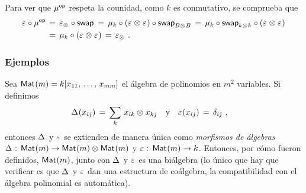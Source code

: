 %
Para ver que $\producto^\opp$ respeta la counidad, como $k$ es conmutativo, se
comprueba que
\begin{align*}
	\counidad\circ\producto^\opp & \,=\,\counidad[\tensor]\circ\swap\,=\,
		\producto[k]\circ(\counidad\tensor\counidad)\circ
			\swap[B\tensor B] \,=\,
		\producto[k]\circ\swap[k\tensor k]\circ
			(\counidad\tensor\counidad) \\
	& \,=\, \producto[k]\circ(\counidad\tensor\counidad)\,=\,
		\counidad[\tensor]
	\text{ .}
\end{align*}
%

\subsubsection{Ejemplos}

\begin{ejemploBialgebra}\label{ejemplo:bialgebramatrices}
	Sea $\MM(m)=k[\lista[11]{x}{mm}]$ el \'{a}lgebra de polinomios en $m^2$
	variables. Si definimos
	\begin{align*}
		\coproducto(x_{ij}) \,=\,\sum_k\,x_{ik}\tensor x_{kj}
			& \quad\text{y}\quad
		\counidad(x_{ij}) \,=\,\delta_{ij}
		\text{ ,}
	\end{align*}
	entonces $\coproducto$ y $\counidad$ se extienden de manera \'{u}nica
	como \emph{morfismos de \'{a}lgebras}
	$\coproducto:\,\MM(m)\rightarrow\MM(m)\tensor\MM(m)$ y
	$\counidad:\,\MM(m)\rightarrow k$. Entonces, por c\'{o}mo fueron
	definidos, $\MM(m)$, junto con $\coproducto$ y $\counidad$ es una
	bi\'{a}lgebra (lo \'{u}nico que hay que verificar es que
	$\coproducto$ y $\counidad$ dan una estructura de co\'{a}lgebra, la
	compatibilidad con el \'{a}lgebra polinomial es autom\'{a}tica).
\end{ejemploBialgebra}

